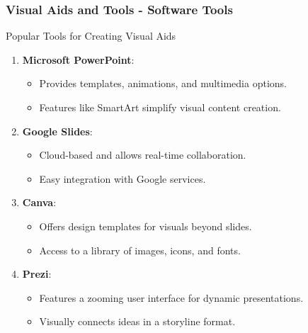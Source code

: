 \documentclass[aspectratio=169]{beamer}
\begin{document}
\begin{frame}[fragile]
    \frametitle{Visual Aids and Tools - Software Tools}
    \begin{block}{Popular Tools for Creating Visual Aids}
        \begin{enumerate}
            \item \textbf{Microsoft PowerPoint}:
            \begin{itemize}
                \item Provides templates, animations, and multimedia options.
                \item Features like SmartArt simplify visual content creation.
            \end{itemize}
            
            \item \textbf{Google Slides}:
            \begin{itemize}
                \item Cloud-based and allows real-time collaboration.
                \item Easy integration with Google services.
            \end{itemize}
            
            \item \textbf{Canva}:
            \begin{itemize}
                \item Offers design templates for visuals beyond slides.
                \item Access to a library of images, icons, and fonts.
            \end{itemize}
            
            \item \textbf{Prezi}:
            \begin{itemize}
                \item Features a zooming user interface for dynamic presentations.
                \item Visually connects ideas in a storyline format.
            \end{itemize}
        \end{enumerate}
    \end{block}
\end{frame}
\end{document}
